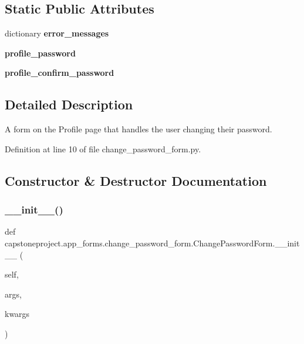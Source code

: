 \subsection*{Static Public Attributes}
\begin{DoxyCompactItemize}
\item 
dictionary {\bfseries error\+\_\+messages}
\item 
{\bfseries profile\+\_\+password}
\item 
{\bfseries profile\+\_\+confirm\+\_\+password}
\end{DoxyCompactItemize}


\subsection{Detailed Description}
\begin{DoxyVerb}A form on the Profile page that handles the user changing their password.
\end{DoxyVerb}
 

Definition at line 10 of file change\+\_\+password\+\_\+form.\+py.



\subsection{Constructor \& Destructor Documentation}
\mbox{\label{classcapstoneproject_1_1app__forms_1_1change__password__form_1_1_change_password_form_aae4a65820ed8ec25d2b1b2b91a6cee09}} 
\subsubsection{\texorpdfstring{\+\_\+\+\_\+init\+\_\+\+\_\+()}{\_\_init\_\_()}}
{\footnotesize\ttfamily def capstoneproject.\+app\+\_\+forms.\+change\+\_\+password\+\_\+form.\+Change\+Password\+Form.\+\_\+\+\_\+init\+\_\+\+\_\+ (\begin{DoxyParamCaption}\item[{}]{self,  }\item[{}]{args,  }\item[{}]{kwargs }\end{DoxyParamCaption})}


